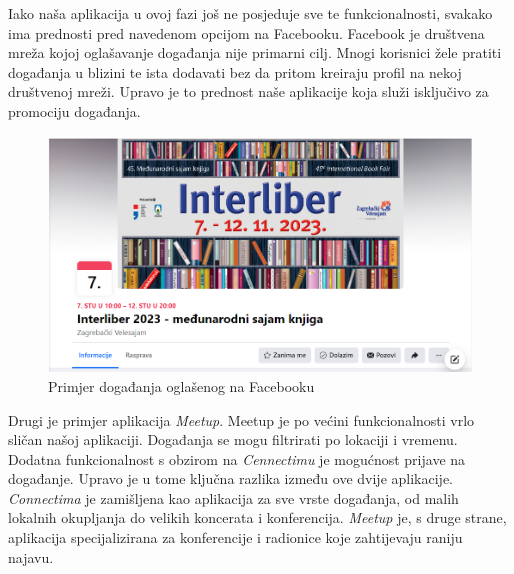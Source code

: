 		Iako naša aplikacija u ovoj fazi još ne posjeduje sve te funkcionalnosti, svakako ima prednosti pred navedenom opcijom na Facebooku. Facebook je društvena mreža kojoj oglašavanje događanja nije primarni cilj. Mnogi korisnici žele pratiti događanja u blizini te ista dodavati bez da pritom kreiraju profil na nekoj društvenoj mreži. Upravo je to prednost naše aplikacije koja služi isključivo za promociju događanja.\\
		
		\begin{figure}[H]
			\includegraphics[scale=0.7]{slike/Facebook_dogadanja.png}
			\centering
			\caption{Primjer događanja oglašenog na Facebooku}
		\end{figure}
		
		
		
		Drugi je primjer aplikacija \textit{Meetup}. Meetup je po većini funkcionalnosti vrlo sličan našoj aplikaciji. Događanja se mogu filtrirati po lokaciji i vremenu. Dodatna funkcionalnost s obzirom na \textit{Cennectimu} je mogućnost prijave na događanje. Upravo je u tome ključna razlika između ove dvije aplikacije. \textit{Connectima} je zamišljena kao aplikacija za sve vrste događanja, od malih lokalnih okupljanja do velikih koncerata i konferencija. \textit{Meetup} je, s druge strane, aplikacija specijalizirana za konferencije i radionice koje zahtijevaju raniju najavu.
		 
